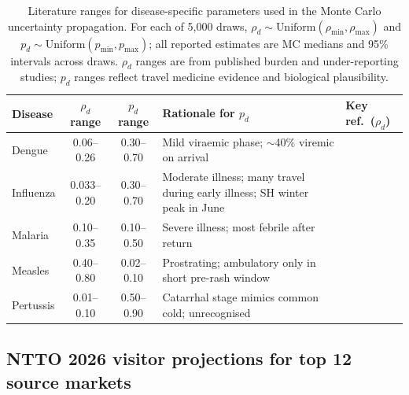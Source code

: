 \documentclass[12pt]{article}
\begin{document}
\begin{table}[h!]
\centering
\caption{Literature ranges for disease-specific parameters used in the
  Monte Carlo uncertainty propagation. For each of 5,000 draws,
  $\rho_d \sim \text{Uniform}(\rho_\text{min}, \rho_\text{max})$ and
  $p_d \sim \text{Uniform}(p_\text{min}, p_\text{max})$; all reported
  estimates are MC medians and 95\% intervals across draws.
  $\rho_d$ ranges are from published burden and under-reporting studies;
  $p_d$ ranges reflect travel medicine evidence and biological plausibility.}
\label{tab:params}
\small
\begin{tabular}{lccp{3.5cm}p{3.2cm}}
\toprule
\textbf{Disease}
  & \textbf{$\rho_d$ range}
  & \textbf{$p_d$ range}
  & \textbf{Rationale for $p_d$}
  & \textbf{Key ref.\ ($\rho_d$)} \\
\midrule
Dengue
  & 0.06--0.26 & 0.30--0.70
  & Mild viraemic phase; $\sim$40\% viremic on arrival
  & \cite{bhatt2013,undurraga2013} \\[3pt]
Influenza
  & 0.033--0.20 & 0.30--0.70
  & Moderate illness; many travel during early illness; SH winter peak in June
  & \cite{WHO_immunization} \\[3pt]
Malaria
  & 0.10--0.35 & 0.10--0.50
  & Severe illness; most febrile after return
  & \cite{whoWMR2024} \\[3pt]
Measles
  & 0.40--0.80 & 0.02--0.10
  & Prostrating; ambulatory only in short pre-rash window
  & \cite{simons2012} \\[3pt]
Pertussis
  & 0.01--0.10 & 0.50--0.90
  & Catarrhal stage mimics common cold; unrecognised
  & \cite{mclaughlin2016} \\
\bottomrule
\end{tabular}
\normalsize
\end{table}

\subsection*{NTTO 2026 visitor projections for top 12 source markets}
\end{document}
